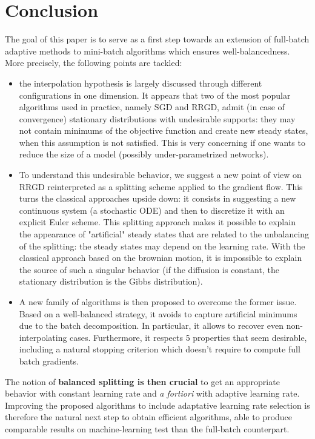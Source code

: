 \documentclass[article,authoryear,jmlmc]{beg_32}             %
\begin{document}
\section{Conclusion}
\label{section_conclusion}

The goal of this paper is to serve as a first step towards an extension of full-batch adaptive methods \cite{Bilel} to mini-batch algorithms which ensures well-balancedness.
More precisely, the following points are tackled:
\begin{itemize}
	\item the interpolation hypothesis is largely discussed through different configurations in one dimension. It appears that two of the most popular algorithms used in practice, namely SGD and RRGD, admit (in case of convergence) stationary distributions with undesirable supports: they may not contain minimums of the objective function and create new steady states, when this assumption is not satisfied. This is very concerning if one wants to reduce the size of a model (possibly under-parametrized networks).
	\item To understand this undesirable behavior, we suggest a new point of view on RRGD reinterpreted as a splitting scheme applied to the gradient flow. This turns the
          classical approaches upside down: it consists in suggesting a new continuous system (a stochastic ODE) and then to discretize it with an explicit Euler scheme. This
          splitting approach makes it possible to explain the appearance of "artificial" steady states that are related to the unbalancing of the splitting: the steady states may depend on the learning rate. With the classical approach based on the brownian motion, it is impossible to explain the source of such a singular behavior (if the diffusion is constant, the stationary distribution is the Gibbs distribution).
         \item A new family of algorithms is then proposed to overcome the former issue. Based on a well-balanced strategy, it avoids to capture artificial minimums due to the batch
           decomposition. In particular, it allows to recover even non-interpolating cases. Furthermore, it respects 5 properties that seem desirable, including a natural stopping
           criterion which doesn't require to compute full batch gradients. 
\end{itemize}

The notion of \textbf{balanced splitting is then crucial} to get an appropriate behavior with constant learning rate and {\em a fortiori} with adaptive learning rate. Improving the
proposed algorithms to include adaptative learning rate selection is therefore the natural next step to obtain efficient algorithms, able to produce comparable results on
machine-learning test than the full-batch counterpart. %
\end{document}

